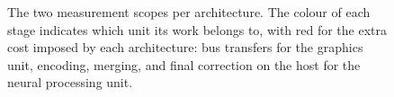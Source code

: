 \begin{figure}[H]
\begin{tikzpicture}[x=1.0cm, y=1.0cm]
    \end{tikzpicture}
    \caption[The two measurement scopes per architecture]{The two measurement scopes per architecture. The colour of each
    stage indicates which unit its work belongs to, with red for the extra
    cost imposed by each architecture: bus transfers for the graphics unit,
    encoding, merging, and final correction on the host for the neural
    processing unit.}
    \label{fig:meth-scopes}
\end{figure}
